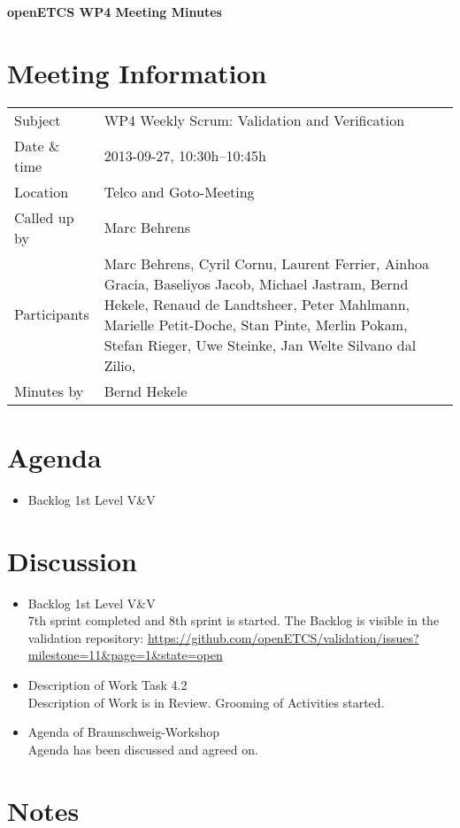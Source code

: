 \documentclass[a4paper, 11pt]{article}
\begin{document}
{\begin{center}\huge\bf openETCS WP4 Meeting Minutes\end{center}}
\section{Meeting Information}

\renewcommand{\arraystretch}{1.5}
\begin{supertabular}{m{.2\textwidth}m{.8\textwidth}}
Subject & WP4 Weekly Scrum: Validation and Verification\\
Date \& time & 2013-09-27, 10:30h--10:45h\\
Location & Telco and Goto-Meeting\\
Called up by & Marc Behrens\\
Participants &
Marc Behrens,
Cyril Cornu,
Laurent Ferrier,
Ainhoa Gracia,
Baseliyos Jacob,
Michael Jastram,
Bernd Hekele,
Renaud de Landtsheer,
Peter Mahlmann,
Marielle Petit-Doche,
Stan Pinte,
Merlin Pokam,
Stefan Rieger,
Uwe Steinke,
Jan Welte
Silvano dal Zilio,
\\

Minutes by & Bernd Hekele\\

\end{supertabular}
\renewcommand{\arraystretch}{1.0}


\section{{Agenda}}
\begin{itemize}
\item Backlog 1st Level V\&V
\end{itemize}

\section{Discussion}

\begin{itemize}
\item Backlog 1st Level V\&V\\
7th sprint completed and 8th sprint is started. 
The Backlog is visible in the validation repository:
\url{https://github.com/openETCS/validation/issues?milestone=11&page=1&state=open}\\

\item Description of Work Task 4.2\\
Description of Work is in Review. Grooming of Activities started.
 
\item Agenda of Braunschweig-Workshop\\
Agenda has been discussed and agreed on.

\end{itemize}


\section{Notes}
\end{document}
